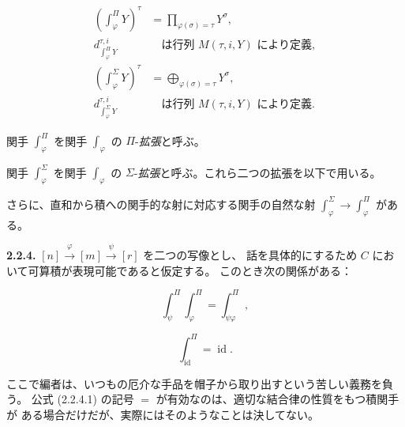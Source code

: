 \clearpage
{}%
%

\begin{equation}
  \begin{aligned}
    \left(\int_{\varphi}^{\Pi}Y\right)^{\tau}
      &=\prod_{\varphi(\sigma)=\tau}Y^{\sigma},\\
    d_{\int_{\varphi}^{\Pi}Y}^{\tau,i}
      &\quad\text{は行列 }M(\tau,i,Y)\text{ により定義},\\[2pt]
    \left(\int_{\varphi}^{\Sigma}Y\right)^{\tau}
      &=\bigoplus_{\varphi(\sigma)=\tau}Y^{\sigma},\\
    d_{\int_{\varphi}^{\Sigma}Y}^{\tau,i}
      &\quad\text{は行列 }M(\tau,i,Y)\text{ により定義}.
  \end{aligned}
  \tag{2.2.3.3}
\end{equation}

関手 $\int_{\varphi}^{\Pi}$ を関手 $\int_\varphi$ の
$\Pi$-\emph{拡張}と呼ぶ。

関手 $\int_{\varphi}^{\Sigma}$ を関手 $\int_\varphi$ の
$\Sigma$-\emph{拡張}と呼ぶ。これら二つの拡張を以下で用いる。

さらに、直和から積への関手的な射に対応する関手の自然な射
$\int_{\varphi}^{\Sigma}\to\int_{\varphi}^{\Pi}$ がある。

\noindent\textbf{2.2.4.}\quad
$[n]\xrightarrow{\varphi}[m]\xrightarrow{\psi}[r]$ を二つの写像とし、
話を具体的にするため $C$ において可算積が表現可能であると仮定する。
このとき次の関係がある：

\begin{equation}
  \int_{\psi}^{\Pi}\int_{\varphi}^{\Pi}
  =\int_{\psi\varphi}^{\Pi},
  \tag{2.2.4.1}
\end{equation}

\begin{equation}
  \int_{\operatorname{id}}^{\Pi}=\operatorname{id}.
  \tag{2.2.4.2}
\end{equation}

ここで編者は、いつもの厄介な手品を帽子から取り出すという苦しい義務を負う。
公式 (2.2.4.1) の記号 $=$ が有効なのは、適切な結合律の性質をもつ積関手が
ある場合だけだが、実際にはそのようなことは決してない。

